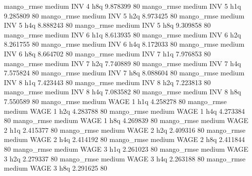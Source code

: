        mango_rmse     medium      INV                 4                  h8q  9.878399 80
       mango_rmse     medium      INV                 5                  h1q  9.285809 80
       mango_rmse     medium      INV                 5                  h2q  8.973425 80
       mango_rmse     medium      INV                 5                  h4q  8.888243 80
       mango_rmse     medium      INV                 5                  h8q  9.309858 80
       mango_rmse     medium      INV                 6                  h1q  8.613935 80
       mango_rmse     medium      INV                 6                  h2q  8.261755 80
       mango_rmse     medium      INV                 6                  h4q  8.172033 80
       mango_rmse     medium      INV                 6                  h8q  8.664702 80
       mango_rmse     medium      INV                 7                  h1q  7.976853 80
       mango_rmse     medium      INV                 7                  h2q  7.740889 80
       mango_rmse     medium      INV                 7                  h4q  7.575824 80
       mango_rmse     medium      INV                 7                  h8q  8.088604 80
       mango_rmse     medium      INV                 8                  h1q  7.423443 80
       mango_rmse     medium      INV                 8                  h2q  7.223813 80
       mango_rmse     medium      INV                 8                  h4q  7.083582 80
       mango_rmse     medium      INV                 8                  h8q  7.550589 80
       mango_rmse     medium     WAGE                 1                  h1q  4.258278 80
       mango_rmse     medium     WAGE                 1                  h2q  4.283788 80
       mango_rmse     medium     WAGE                 1                  h4q  4.273384 80
       mango_rmse     medium     WAGE                 1                  h8q  4.269839 80
       mango_rmse     medium     WAGE                 2                  h1q  2.415377 80
       mango_rmse     medium     WAGE                 2                  h2q  2.409316 80
       mango_rmse     medium     WAGE                 2                  h4q  2.414192 80
       mango_rmse     medium     WAGE                 2                  h8q  2.411844 80
       mango_rmse     medium     WAGE                 3                  h1q  2.261023 80
       mango_rmse     medium     WAGE                 3                  h2q  2.279337 80
       mango_rmse     medium     WAGE                 3                  h4q  2.263188 80
       mango_rmse     medium     WAGE                 3                  h8q  2.291625 80
